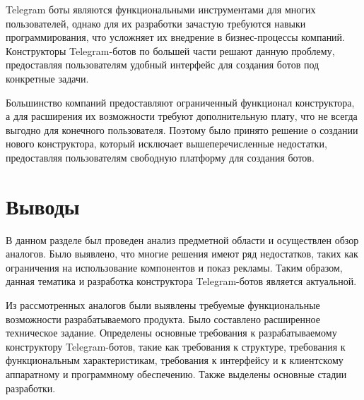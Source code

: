 Telegram боты являются функциональными инструментами для многих пользователей,
однако для их разработки зачастую требуются навыки программирования,
что усложняет их внедрение в бизнес-процессы компаний.
Конструкторы Telegram-ботов по большей части решают данную проблему,
предоставляя пользователям удобный интерфейс для создания ботов под конкретные задачи.

Большинство компаний предоставляют ограниченный
функционал конструктора, а для расширения их возможности требуют дополнительную
плату, что не всегда выгодно для конечного пользователя.
Поэтому было принято решение о создании нового конструктора, который исключает
вышеперечисленные недостатки, предоставляя пользователям свободную платформу для
создания ботов.





\section*{Выводы}

В данном разделе был проведен анализ предметной области и осуществлен обзор аналогов.
Было выявлено, что многие решения имеют ряд недостатков,
таких как ограничения на использование компонентов и показ рекламы.
Таким образом, данная тематика
и разработка конструктора Telegram-ботов является актуальной.

Из рассмотренных аналогов были выявлены требуемые
функциональные возможности разрабатываемого продукта.
Было составлено расширенное техническое задание.
Определены основные требования к разрабатываемому конструктору Telegram-ботов, такие как
требования к структуре, требования к функциональным характеристикам,
требования к интерфейсу и к
клиентскому аппаратному и программному обеспечению.
Также выделены основные стадии разработки.


